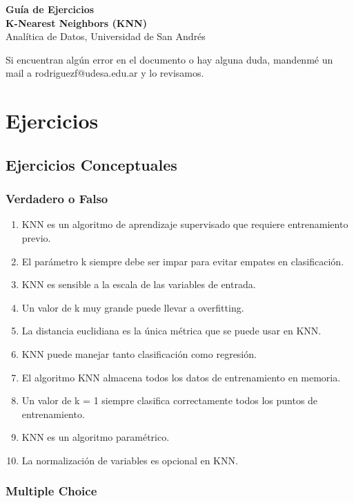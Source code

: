 \documentclass[12pt]{article}
\begin{document}
\begin{center}
  {\LARGE \textbf{Guía de Ejercicios\\K-Nearest Neighbors (KNN)}}\\[0.5em]
  {Analítica de Datos, Universidad de San Andrés}
\end{center}

Si encuentran algún error en el documento o hay alguna duda, mandenmé un mail a rodriguezf@udesa.edu.ar y lo revisamos.

\section{Ejercicios}

\subsection{Ejercicios Conceptuales}

\subsubsection{Verdadero o Falso}

\begin{enumerate}
    \item KNN es un algoritmo de aprendizaje supervisado que requiere entrenamiento previo.
    \item El parámetro k siempre debe ser impar para evitar empates en clasificación.
    \item KNN es sensible a la escala de las variables de entrada.
    \item Un valor de k muy grande puede llevar a overfitting.
    \item La distancia euclidiana es la única métrica que se puede usar en KNN.
    \item KNN puede manejar tanto clasificación como regresión.
    \item El algoritmo KNN almacena todos los datos de entrenamiento en memoria.
    \item Un valor de k = 1 siempre clasifica correctamente todos los puntos de entrenamiento.
    \item KNN es un algoritmo paramétrico.
    \item La normalización de variables es opcional en KNN.
\end{enumerate}

\subsubsection{Multiple Choice}
\end{document}
